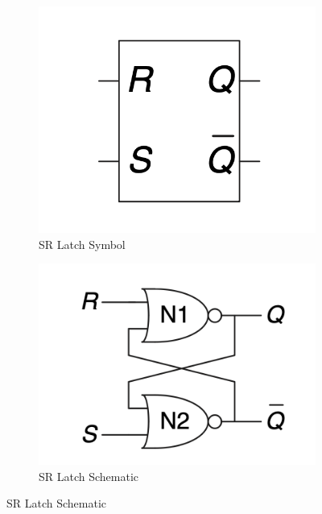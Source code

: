 \documentclass[12pt]{report}
\begin{document}
\begin{figure}[H]
    \centering
    \begin{subfigure}{0.45\textwidth}
        \centering
        \includegraphics[width=\textwidth]{SR_latch_symbol.png}
        \caption{SR Latch Symbol}
    \end{subfigure}
    \hfill
    \begin{subfigure}{0.45\textwidth}
        \centering
        \includegraphics[width=\textwidth]{SR_latch_schematic.png}
        \caption{SR Latch Schematic}
    \end{subfigure}
\end{figure}
\end{document}
